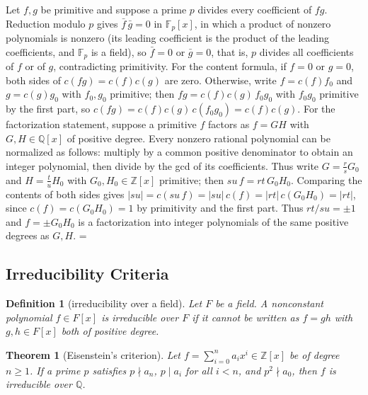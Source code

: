 \documentclass[11pt]{article}
\makeatletter
\theoremstyle{ntstyle}
\newtheorem{theorem}{Theorem}[subsection]
\newtheorem{definition}{Definition}[subsection]
\let\nt@closedisplay\]
\def\nt@guardedclose{\@ifnextchar\par{\nt@closeafterpar}{\@ifnextchar\end{\postdisplaypenalty\@M\nt@closedisplay}{\nt@closedisplay}}}
\def\nt@closeafterpar\par{\@ifnextchar\par{\nt@closeafterpar}{\@ifnextchar\end{\postdisplaypenalty\@M\nt@closedisplay\par}{\nt@closedisplay\par}}}
\renewenvironment{proof}[1][\proofname]{\par
  \pushQED{\qed}\normalfont\topsep\medskipamount\edef\nt@afterproof{\@endparpenalty=\the\@endparpenalty\relax}\@beginparpenalty\@M\@endparpenalty\@M\let\]\nt@guardedclose\trivlist\item[]\textit{#1\@addpunct{.}} \ignorespaces}{\ifvmode\addpenalty\@M\fi\popQED\nt@afterproof\endtrivlist\@endpefalse}
\makeatother
\begin{document}
\begin{proof} Let $f,g$ be primitive and suppose a prime
	$p$ divides every coefficient of $fg$. Reduction modulo $p$ gives $\bar f\,\bar g
		= 0$ in $\mathbb{F}_p[x]$, in which a product of nonzero polynomials is
	nonzero (its leading coefficient is the product of the leading
	coefficients, and $\mathbb{F}_p$ is a field), so $\bar f = 0$ or
	$\bar g = 0$, that is, $p$ divides all coefficients of $f$ or of $g$,
	contradicting primitivity. For the content formula, if $f=0$ or $g=0$,
	both sides of $c(fg)=c(f)c(g)$ are zero. Otherwise, write $f = c(f)f_0$
	and $g = c(g)g_0$ with $f_0, g_0$
	primitive; then $fg = c(f)c(g)\,f_0g_0$ with $f_0g_0$ primitive by the
	first part, so $c(fg) = c(f)c(g)\,c(f_0g_0) = c(f)c(g)$. For the
	factorization statement, suppose a
	primitive $f$ factors as $f=GH$ with $G,H\in\mathbb{Q}[x]$ of
	positive degree. Every nonzero rational polynomial can be normalized as follows: multiply by a
	common positive denominator to obtain an integer polynomial, then divide by the gcd of its
	coefficients. Thus write $G=\tfrac{r}{s}G_0$ and $H=\tfrac{t}{u}H_0$ with
	$G_0,H_0\in\mathbb{Z}[x]$ primitive; then $su\,f=rt\,G_0H_0$.
	Comparing the contents of both sides gives
	$|su|=c(su\,f)=|su|\,c(f)=|rt|\,c(G_0H_0)=|rt|$, since
	$c(f)=c(G_0H_0)=1$ by primitivity and the first part. Thus $rt/su=\pm1$ and $f=\pm
		G_0H_0$ is a factorization into integer polynomials of the same
	positive degrees as $G,H$.
\end{proof}
\subsection{Irreducibility Criteria}

\begin{definition}[irreducibility over a field]\label{def:11.3.1}
	Let $F$ be a field. A nonconstant polynomial $f\in F[x]$ is
	irreducible over $F$ if it cannot be written as $f=gh$ with
	$g,h\in F[x]$ both of positive degree.
\end{definition}
\begin{theorem}[Eisenstein's criterion]\label{thm:11.3.1} Let $f = \sum_{i=0}^n
		a_i x^i\in\mathbb{Z}[x]$ be of degree $n\ge1$. If a prime $p$ satisfies $p\nmid a_n$,
	$p\mid a_i$ for all $i<n$, and $p^2\nmid a_0$, then $f$ is
	irreducible over $\mathbb{Q}$.
\end{theorem}
\end{document}
